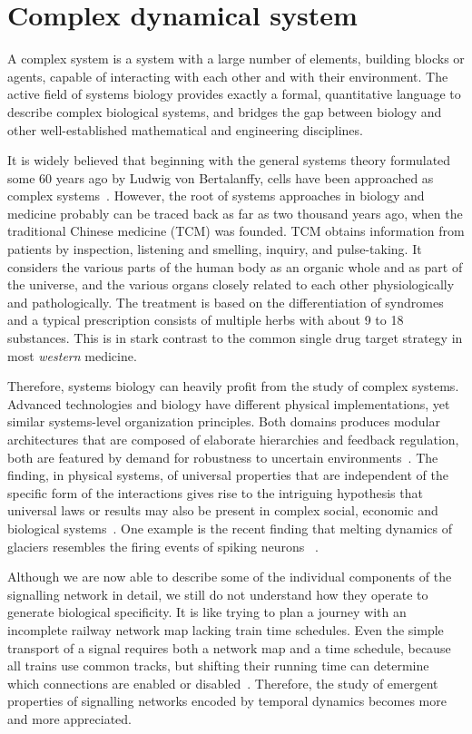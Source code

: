 \section{Complex dynamical system}
A complex system is a system with a large number of
elements, building blocks or agents, capable of interacting
with each other and with their environment.
The
active field of systems biology provides exactly a formal,
quantitative language to describe complex biological 
systems, and
bridges the gap between biology and other well-established
mathematical and engineering disciplines. 

It is widely believed that beginning with the general 
systems theory formulated some 
60 years ago by Ludwig von Bertalanffy, cells have been
approached as complex systems~\citep{Lazebnik2002a}. 
However, the root of systems approaches in biology and
medicine probably can be traced back as far as two 
thousand years
ago, when the traditional Chinese medicine (TCM) was 
founded. TCM obtains information from patients by 
inspection, 
listening and smelling, inquiry, and pulse-taking. 
It considers the various parts of the 
human body as an organic whole and as part of the 
universe, and the various organs closely 
related to each other physiologically and pathologically. 
The treatment is based on the 
differentiation of syndromes and a typical prescription
consists of multiple herbs with about 9 to 18 substances.
This is in stark contrast to the common single drug
target strategy in most \emph{western} medicine.

Therefore, systems biology can heavily profit from the
study of complex systems.
Advanced technologies and biology have different physical
implementations, yet similar systems-level organization
principles. Both domains produces modular architectures that are composed of elaborate hierarchies and feedback regulation, both are featured by demand for
robustness to uncertain environments~\citep{Csete2002}.
The
finding, in physical systems, of universal properties that
are independent of the specific form of the interactions
gives rise to the intriguing hypothesis that universal laws
or results may also be present in complex social, economic
and biological systems~\citep{Amaral2004}. One example is 
the recent finding that melting dynamics of glaciers
resembles the firing events of spiking neurons~%
\citep{Chapuis2012}.

Although we are now able to describe some of the individual 
components of the 
signalling network in detail, we still do not understand how they operate to generate biological specificity. It is like trying to plan a journey with an incomplete railway network map lacking train time schedules. Even the simple transport of a signal requires both a network map and a time schedule,
because all trains use common tracks, but shifting their 
running time can determine which connections are enabled or disabled~\citep{Kholodenko2010}.
Therefore, the study of emergent properties of signalling networks encoded by temporal dynamics becomes more and more
appreciated.

